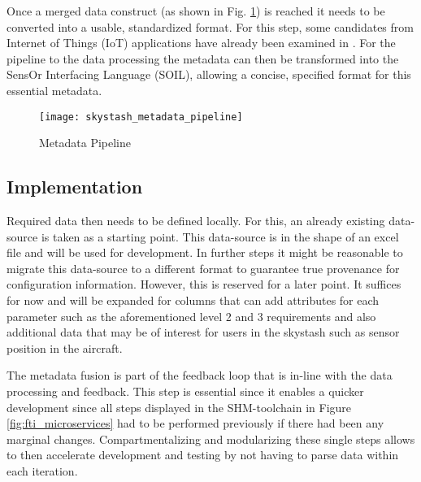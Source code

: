Once a merged data construct (as shown in Fig. \ref{fig:skystash_metadata_pipeline}) is reached it needs to be converted into a usable, standardized format. For this step, some candidates from Internet of Things (IoT) applications have already been examined in \textcite{bodenbenner_model-driven_2022}. For the pipeline to the data processing the metadata can then be transformed into the SensOr Interfacing Language (SOIL), allowing a concise, specified format for this essential metadata.

\begin{figure}
    \centering
    \texttt{[image: skystash\_metadata\_pipeline]}
    \caption{Metadata Pipeline}
    \label{fig:skystash_metadata_pipeline}
\end{figure}

\subsection{Implementation}
Required data then needs to be defined locally. For this, an already existing data-source is taken as a starting point. This data-source is in the shape of an excel file and will be used for development. In further steps it might be reasonable to migrate this data-source to a different format to guarantee true provenance for configuration information. However, this is reserved for a later point. It suffices for now and will be expanded for columns that can add attributes for each parameter such as the aforementioned level 2 and 3 requirements and also additional data that may be of interest for users in the skystash such as sensor position in the aircraft.

The metadata fusion is part of the feedback loop that is in-line with the data processing and feedback. This step is essential since it enables a quicker development since all steps displayed in the SHM-toolchain in Figure \ref{fig:fti_microservices} had to be performed previously if there had been any marginal changes. Compartmentalizing and modularizing these single steps allows to then accelerate development and testing by not having to parse data within each iteration.

